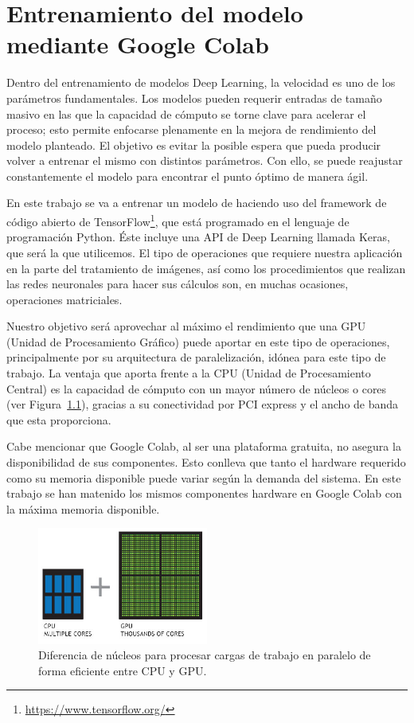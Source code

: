 \mbox{}


\chapter{Entrenamiento del modelo mediante Google Colab}
\label{ch:chapter2}
Dentro del entrenamiento de modelos Deep Learning\cite{advanced_convolutional_network}, la velocidad es uno de los parámetros fundamentales.
Los modelos pueden requerir entradas de tamaño masivo en las que la capacidad de cómputo se torne clave para acelerar el proceso;
esto permite enfocarse plenamente en la mejora de rendimiento del modelo planteado.
El objetivo es evitar la posible espera que pueda producir volver a entrenar el mismo con distintos parámetros.
Con ello, se puede reajustar constantemente el modelo para encontrar el punto óptimo de manera ágil.

En este trabajo se va a entrenar un modelo de  haciendo uso del framework de código abierto de TensorFlow\footnote{\url{https://www.tensorflow.org/}}, que está programado en el lenguaje de programación Python.
Éste incluye una API de Deep Learning llamada Keras, que será la que utilicemos.
El tipo de operaciones que requiere nuestra aplicación en la parte del tratamiento de imágenes, así como los procedimientos que realizan las redes neuronales\cite{neural_network} para hacer sus cálculos son, en muchas ocasiones,
operaciones matriciales.

Nuestro objetivo será aprovechar al máximo el rendimiento que una GPU (Unidad de Procesamiento Gráfico) puede aportar en este tipo de operaciones, principalmente por su arquitectura de paralelización, idónea para este tipo de trabajo.
La ventaja que aporta frente a la CPU (Unidad de Procesamiento Central) es la capacidad de cómputo con un mayor número de núcleos o cores (ver Figura~\ref{fig:Arquitectura de paralelización de una GPU}), gracias a su conectividad por PCI express y el ancho de banda que esta proporciona.

Cabe mencionar que Google Colab, al ser una plataforma gratuita, no asegura la disponibilidad de sus componentes.
Esto conlleva que tanto el hardware requerido como su memoria disponible puede variar según la demanda del sistema.
En este trabajo se han matenido los mismos componentes hardware en Google Colab con la máxima memoria disponible.
\begin{figure}
    \centering
    \includegraphics[width=0.5\textwidth]{images/chapter2/cpu-and-gpu.jpg}
    \caption{Diferencia de núcleos para procesar cargas de trabajo en paralelo de forma eficiente entre CPU y GPU.}
    \label{fig:Arquitectura de paralelización de una GPU}
\end{figure}


